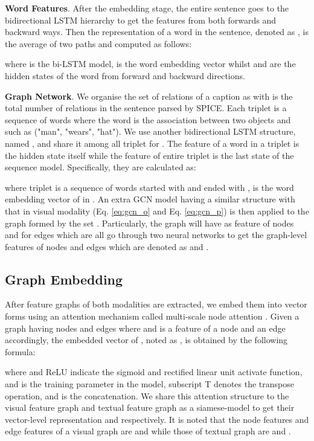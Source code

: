 \documentclass{IOS-Book-Article}
\begin{document}
\textbf{Word Features}. After the embedding stage, the entire sentence goes to the bidirectional LSTM hierarchy to get the features from both forwards and backward ways. Then the representation of a word  in the sentence, denoted as , is the average of two paths and computed as follows:

where  is the bi-LSTM model,  is the word embedding vector whilst  and  are the hidden states of the word  from forward and backward directions.

\textbf{Graph Network}. We organise the set of relations of a caption as  with  is the total number of relations in the sentence parsed by SPICE. Each triplet  is a sequence of words  where the word  is the association between two objects  and  such as ("man", "wears", "hat"). We use another bidirectional LSTM structure, named , and share it among all triplet  for . The feature of a word in a triplet is the hidden state itself while the feature of entire triplet is the last state of the sequence model. Specifically, they are calculated as: 


where triplet  is a sequence of words started with  and ended with ,  is the word embedding vector of  in . An extra GCN model having a similar structure with that in visual modality (Eq. \ref{eq:gcn_o} and Eq. \ref{eq:gcn_p}) is then applied to the graph formed by the set . Particularly, the graph will have  as feature of nodes and  for edges which are all go through two neural networks to get the graph-level features of nodes and edges which are denoted as  and .

\subsection{Graph Embedding}
After feature graphs of both modalities are extracted, we embed them into vector forms using an attention mechanism called multi-scale node attention \cite{bai2019unsupervised}. Given a graph  having  nodes  and  edges  where  and  is a feature of a node and an edge accordingly, the embedded vector of , noted as , is obtained by the following formula:

where  and ReLU indicate the sigmoid and rectified linear unit activate function,  and  is the training parameter in the model, subscript T denotes the transpose operation, and  is the concatenation. We share this attention structure to the visual feature graph and textual feature graph as a siamese-model to get their vector-level representation  and  respectively. It is noted that the node features and edge features of a visual graph are  and  while those of textual graph are  and .
\end{document}
